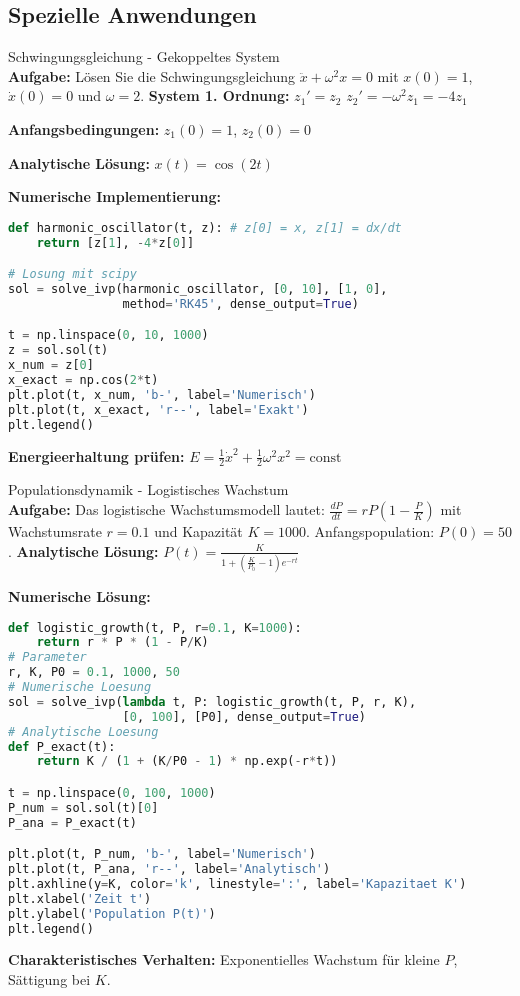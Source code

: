 \subsection{Spezielle Anwendungen}

\begin{example2}{Schwingungsgleichung - Gekoppeltes System}\\
\textbf{Aufgabe:} Lösen Sie die Schwingungsgleichung $\ddot{x} + \omega^2 x = 0$ mit $x(0) = 1$, $\dot{x}(0) = 0$ und $\omega = 2$.
\tcblower
\textbf{System 1. Ordnung:}
$z_1' = z_2$
$z_2' = -\omega^2 z_1 = -4z_1$

\textbf{Anfangsbedingungen:} $z_1(0) = 1$, $z_2(0) = 0$

\textbf{Analytische Lösung:} $x(t) = \cos(2t)$

\textbf{Numerische Implementierung:}
\begin{lstlisting}[language=Python, style=basesmol]
def harmonic_oscillator(t, z): # z[0] = x, z[1] = dx/dt
    return [z[1], -4*z[0]]

# Losung mit scipy
sol = solve_ivp(harmonic_oscillator, [0, 10], [1, 0], 
                method='RK45', dense_output=True)

t = np.linspace(0, 10, 1000)
z = sol.sol(t)
x_num = z[0]
x_exact = np.cos(2*t)
plt.plot(t, x_num, 'b-', label='Numerisch')
plt.plot(t, x_exact, 'r--', label='Exakt')
plt.legend()
\end{lstlisting}

\textbf{Energieerhaltung prüfen:} 
$E = \frac{1}{2}\dot{x}^2 + \frac{1}{2}\omega^2 x^2 = \text{const}$
\end{example2}

\begin{example2}{Populationsdynamik - Logistisches Wachstum}\\
\textbf{Aufgabe:} Das logistische Wachstumsmodell lautet:
$\frac{dP}{dt} = rP\left(1 - \frac{P}{K}\right)$
mit Wachstumsrate $r = 0.1$ und Kapazität $K = 1000$. Anfangspopulation: $P(0) = 50$.
\tcblower
\textbf{Analytische Lösung:}
$P(t) = \frac{K}{1 + \left(\frac{K}{P_0} - 1\right)e^{-rt}}$

\textbf{Numerische Lösung:}
\begin{lstlisting}[language=Python, style=basesmol]
def logistic_growth(t, P, r=0.1, K=1000):
    return r * P * (1 - P/K)
# Parameter
r, K, P0 = 0.1, 1000, 50
# Numerische Loesung
sol = solve_ivp(lambda t, P: logistic_growth(t, P, r, K), 
                [0, 100], [P0], dense_output=True)
# Analytische Loesung
def P_exact(t):
    return K / (1 + (K/P0 - 1) * np.exp(-r*t))

t = np.linspace(0, 100, 1000)
P_num = sol.sol(t)[0]
P_ana = P_exact(t)

plt.plot(t, P_num, 'b-', label='Numerisch')
plt.plot(t, P_ana, 'r--', label='Analytisch')
plt.axhline(y=K, color='k', linestyle=':', label='Kapazitaet K')
plt.xlabel('Zeit t')
plt.ylabel('Population P(t)')
plt.legend()
\end{lstlisting}

\textbf{Charakteristisches Verhalten:} Exponentielles Wachstum für kleine $P$, Sättigung bei $K$.
\end{example2}

